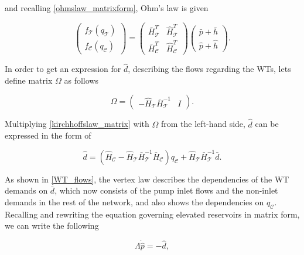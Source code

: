 and recalling \eqref{ohmslaw_matrixform}, Ohm's law is given

\begin{equation}
\label{ohmslaw_matrixform11}
 \begin{pmatrix} 
 f_{\mathcal{T}}(q_\mathcal{T}) \\[3pt]
 f_{\mathcal{C}}(q_\mathcal{C}) 
 \end{pmatrix}
 =
 \begin{pmatrix}
   \bar{H}^T_{\mathcal{T}} & \hat{H}^T_{\mathcal{T}} \\[3pt]
   \bar{H}^T_{\mathcal{C}} & \hat{H}^T_{\mathcal{C}} 
   \end{pmatrix}
   \begin{pmatrix} 
 \bar{p} + \bar{h} \\[3pt] 
 \hat{p} + \hat{h} 
 \end{pmatrix}.
\end{equation}

In order to get an expression for $\hat{d}$, describing the flows regarding the WTs, lets define matrix $\Omega$ as follows

\begin{equation}
\label{omega_matrix}
\Omega
=
\begin{pmatrix} 
 -\hat{H}_{\mathcal{T}}  \bar{H}^{-1}_{\mathcal{T}}  & I  
 \end{pmatrix}.
\end{equation}

Multiplying \eqref{kirchhoffslaw_matrix} with $\Omega$ from the left-hand side, $\hat{d}$ can be expressed in the form of

\begin{equation}
\label{WT_flows}
\hat{d} = (\hat{H}_{\mathcal{C}} - \hat{H}_{\mathcal{T}} \bar{H}^{-1}_{\mathcal{T}}\bar{H}_{\mathcal{C}})  q_\mathcal{C}  + \hat{H}_{\mathcal{T}} \bar{H}^{-1}_{\mathcal{T}} \bar{d}.
\end{equation}

As shown in \eqref{WT_flows}, the vertex law describes the dependencies of the WT demands on $\bar{d}$, which now consists of the pump inlet flows and the non-inlet demands in the rest of the network, and also shows the dependencies on $q_\mathcal{C}$. Recalling and rewriting the equation governing elevated reservoirs in matrix form, we can write the following

\begin{equation}
\label{WT_matrixform}
\Lambda \dot{\hat{p}} = - \hat{d},
\end{equation}

